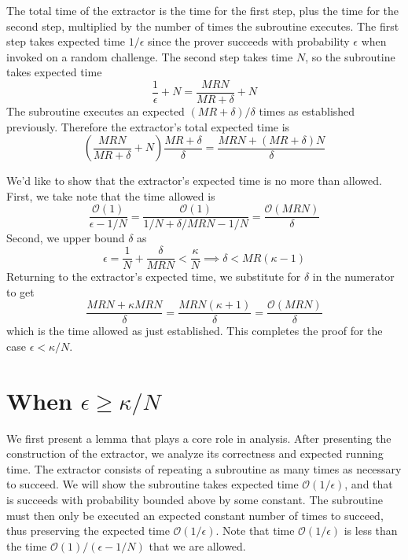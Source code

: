 The total time of the extractor is the time for the first step, plus the time for the second step, multiplied by the number of times the subroutine executes.
The first step takes expected time $1/\epsilon$ since the prover succeeds with probability $\epsilon$ when invoked on a random challenge.
The second step takes time $N$, so the subroutine takes expected time
\begin{equation}
    \frac{1}{\epsilon} + N = \frac{MRN}{MR+\delta} + N
\end{equation}
The subroutine executes an expected $(MR+\delta)/\delta$ times as established previously.
Therefore the extractor's total expected time is
\begin{equation}
    \left(\frac{MRN}{MR+\delta} + N\right)\frac{MR+\delta}{\delta}
    = \frac{MRN + (MR + \delta)N}{\delta}
\end{equation}

We'd like to show that the extractor's expected time is no more than allowed.
First, we take note that the time allowed is
\begin{equation}
    \frac{\mathcal{O}(1)}{\epsilon - 1/N}
    = \frac{\mathcal{O}(1)}{1/N + \delta/MRN - 1/N}
    = \frac{\mathcal{O}(MRN)}{\delta}
\end{equation}
Second, we upper bound $\delta$ as
\begin{equation}
    \epsilon = \frac{1}{N} + \frac{\delta}{MRN} < \frac{\kappa}{N}
    \implies
    \delta < MR(\kappa - 1)
\end{equation}
Returning to the extractor's expected time, we substitute for $\delta$ in the numerator to get
\begin{equation}
    \frac{MRN + \kappa MRN}{\delta}
    = \frac{MRN(\kappa+1)}{\delta}
    = \frac{\mathcal{O}(MRN)}{\delta}
\end{equation}
which is the time allowed as just established.
This completes the proof for the case $\epsilon < \kappa/N$.


\section[When epsilon geq kappa/N)]{When $\epsilon \geq \kappa/N$}

We first present a lemma that plays a core role in analysis.
After presenting the construction of the extractor, we analyze its correctness and expected running time.
The extractor consists of repeating a subroutine as many times as necessary to succeed.
We will show the subroutine takes expected time $\mathcal{O}(1/\epsilon)$, and that is succeeds with probability bounded above by some constant.
The subroutine must then only be executed an expected constant number of times to succeed, thus preserving the expected time $\mathcal{O}(1/\epsilon)$.
Note that time $\mathcal{O}(1/\epsilon)$ is less than the time $\mathcal{O}(1)/(\epsilon-1/N)$ that we are allowed.



